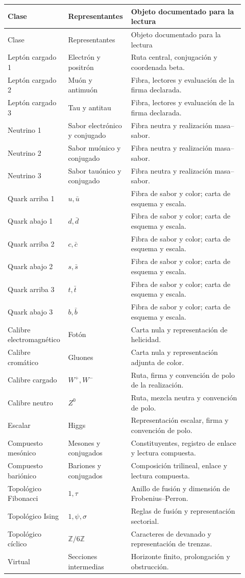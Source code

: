 \begingroup
\small
\setlength{\tabcolsep}{3pt}
\begin{longtable}{p{0.20\linewidth}p{0.25\linewidth}p{0.47\linewidth}}
\toprule
Clase & Representantes & Objeto documentado para la lectura\\
\midrule
\endfirsthead
\toprule
Clase & Representantes & Objeto documentado para la lectura\\
\midrule
\endhead
\bottomrule
\endfoot
Leptón cargado 1 & Electrón y positrón & Ruta central, conjugación y coordenada beta.\\
Leptón cargado 2 & Muón y antimuón & Fibra, lectores y evaluación de la firma declarada.\\
Leptón cargado 3 & Tau y antitau & Fibra, lectores y evaluación de la firma declarada.\\
Neutrino 1 & Sabor electrónico y conjugado & Fibra neutra y realización masa--sabor.\\
Neutrino 2 & Sabor muónico y conjugado & Fibra neutra y realización masa--sabor.\\
Neutrino 3 & Sabor tauónico y conjugado & Fibra neutra y realización masa--sabor.\\
Quark arriba 1 & \(u,\bar u\) & Fibra de sabor y color; carta de esquema y escala.\\
Quark abajo 1 & \(d,\bar d\) & Fibra de sabor y color; carta de esquema y escala.\\
Quark arriba 2 & \(c,\bar c\) & Fibra de sabor y color; carta de esquema y escala.\\
Quark abajo 2 & \(s,\bar s\) & Fibra de sabor y color; carta de esquema y escala.\\
Quark arriba 3 & \(t,\bar t\) & Fibra de sabor y color; carta de esquema y escala.\\
Quark abajo 3 & \(b,\bar b\) & Fibra de sabor y color; carta de esquema y escala.\\
Calibre electromagnético & Fotón & Carta nula y representación de helicidad.\\
Calibre cromático & Gluones & Carta nula y representación adjunta de color.\\
Calibre cargado & \(W^+,W^-\) & Ruta, firma y convención de polo de la realización.\\
Calibre neutro & \(Z^0\) & Ruta, mezcla neutra y convención de polo.\\
Escalar & Higgs & Representación escalar, firma y convención de polo.\\
Compuesto mesónico & Mesones y conjugados & Constituyentes, registro de enlace y lectura compuesta.\\
Compuesto bariónico & Bariones y conjugados & Composición trilineal, enlace y lectura compuesta.\\
Topológico Fibonacci & \(1,\tau\) & Anillo de fusión y dimensión de Frobenius--Perron.\\
Topológico Ising & \(1,\psi,\sigma\) & Reglas de fusión y representación sectorial.\\
Topológico cíclico & \(\mathbb Z/6\mathbb Z\) & Caracteres de devanado y representación de trenzas.\\
Virtual & Secciones intermedias & Horizonte finito, prolongación y obstrucción.\\
\end{longtable}
